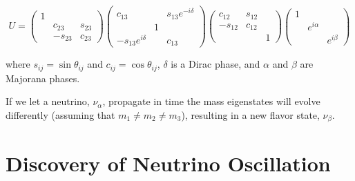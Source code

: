 \begin{equation}	
	U = 
	\begin{pmatrix}
		1 & & \\
		& c_{23} & s_{23} \\
		& -s_{23} & c_{23}
	\end{pmatrix}
	\begin{pmatrix}
		c_{13} & & s_{13}e^{-i\delta} \\
		& 1 &	\\
		-s_{13}e^{i\delta} & & c_{13}
	\end{pmatrix}
	\begin{pmatrix}
		c_{12} & s_{12} & \\
		-s_{12} & c_{12} & \\
		& & 1
	\end{pmatrix}
	\begin{pmatrix}
		1 & & \\
		& e^{i\alpha}  & \\
		& & e^{i\beta}
	\end{pmatrix}
\end{equation}

where $s_{ij} = \sin\theta_{ij}$ and $c_{ij} = \cos\theta_{ij}$, $\delta$ is a Dirac phase, and $\alpha$ and $\beta$ are Majorana phases.

If we let a neutrino, $\nu_\alpha$, propagate in time the mass eigenstates will evolve differently (assuming that $m_{1} \neq m_{2} \neq m_{3}$), resulting in a new flavor state, $\nu_{\beta}$.






\section{Discovery of Neutrino Oscillation} \label{sec:NeutrinoOsc}


